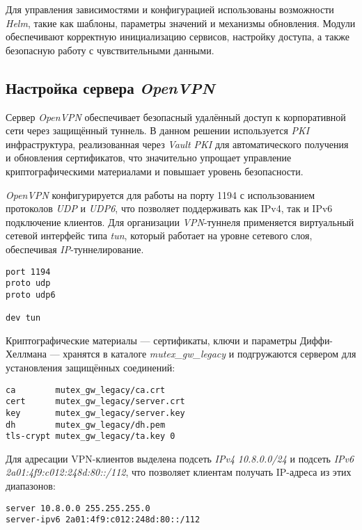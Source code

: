 Для управления зависимостями и конфигурацией использованы возможности \textit{Helm}, такие как шаблоны, параметры значений и механизмы обновления. Модули обеспечивают корректную инициализацию сервисов, настройку доступа, а также безопасную работу с чувствительными данными.

\subsection{Настройка сервера \textit{OpenVPN}}

Сервер \textit{OpenVPN} обеспечивает безопасный удалённый доступ к корпоративной сети через защищённый туннель. В данном решении используется \textit{PKI} инфраструктура, реализованная через \textit{Vault PKI} для автоматического получения и обновления сертификатов, что значительно упрощает управление криптографическими материалами и повышает уровень безопасности.

\textit{OpenVPN} конфигурируется для работы на порту 1194 с использованием протоколов \textit{UDP} и \textit{UDP6}, что позволяет поддерживать как IPv4, так и IPv6 подключение клиентов. Для организации \textit{VPN}-туннеля применяется виртуальный сетевой интерфейс типа \textit{tun}, который работает на уровне сетевого слоя, обеспечивая \textit{IP}-туннелирование.

\begin{lstlisting}
port 1194
proto udp
proto udp6

dev tun
\end{lstlisting}

Криптографические материалы — сертификаты, ключи и параметры Диффи-Хеллмана — хранятся в каталоге \textit{mutex\_gw\_legacy} и подгружаются сервером для установления защищённых соединений:

\begin{lstlisting}
ca        mutex_gw_legacy/ca.crt
cert      mutex_gw_legacy/server.crt
key       mutex_gw_legacy/server.key
dh        mutex_gw_legacy/dh.pem
tls-crypt mutex_gw_legacy/ta.key 0
\end{lstlisting}

Для адресации VPN-клиентов выделена подсеть \textit{IPv4} \textit{10.8.0.0/24} и подсеть \textit{IPv6} \textit{2a01:4f9:c012:248d:80::/112}, что позволяет клиентам получать IP-адреса из этих диапазонов:

\begin{lstlisting}
server 10.8.0.0 255.255.255.0
server-ipv6 2a01:4f9:c012:248d:80::/112
\end{lstlisting}

